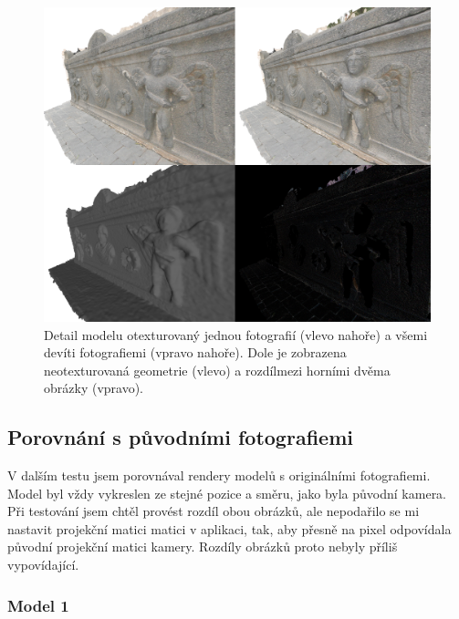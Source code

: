 \documentclass[11pt,twoside,a4paper]{book}
\begin{document}
\begin{figure}[h!]
\begin{center}
\includegraphics[width=\textwidth]{figures/test-5}
\caption{Detail modelu otexturovaný jednou fotografií (vlevo nahoře) a všemi devíti fotografiemi (vpravo nahoře). Dole je zobrazena neotexturovaná geometrie (vlevo) a rozdíl\protect\footnotemark mezi horními dvěma obrázky (vpravo).}
\label{fig:test-5}
\end{center}
\end{figure}

\subsection{Porovnání s původními fotografiemi}

V dalším testu jsem porovnával rendery modelů s originálními fotografiemi. Model byl vždy vykreslen ze stejné pozice a směru, jako byla původní kamera. Při testování jsem chtěl provést rozdíl obou obrázků, ale nepodařilo se mi nastavit projekční matici matici v aplikaci, tak, aby přesně na pixel odpovídala původní projekční matici kamery. Rozdíly obrázků proto nebyly příliš vypovídající.

\subsubsection*{Model 1}
\end{document}

